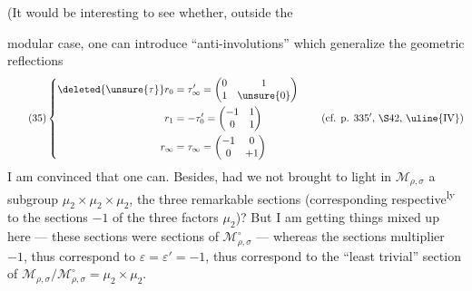 (It would be interesting to see whether, outside the


modular case, one can introduce ``anti-involutions'' which generalize the geometric reflections
\[
\tag{35}
\left\{
\begin{aligned}
\deleted{\unsure{\tau}}r_0&=\tau'_\infty=\begin{pmatrix}0&1\\1&\unsure{0}\end{pmatrix}\\
r_1&=-\tau'_0=\begin{pmatrix}-1&1\\0&1\end{pmatrix}\\
r_\infty&=\tau_\infty=\begin{pmatrix}-1&0\\0&+1\end{pmatrix}
\end{aligned}
\right.
\qquad\text{(cf. p. $335'$, $\S42$, $\uline{\mathrm{IV}}$)}
\]
I am convinced that one can. Besides, had we not brought to light in $\mathcal M_{\rho,\sigma}$ a subgroup $\mu_2\times\mu_2\times\mu_2$,   the three remarkable sections (corresponding respective\textsuperscript{ly} to the  sections $-1$ of the three factors $\mu_2$)? But I am getting things mixed up here --- these sections were sections of $\mathcal M_{\rho,\sigma}^{\circ}$ --- whereas the sections    multiplier
$-1$, thus correspond to $\varepsilon=\varepsilon'=-1$, thus correspond to the ``least trivial'' section  of $\mathcal M_{\rho,\sigma}/\mathcal M_{\rho,\sigma}^{\circ}=\mu_2\times\mu_2$.

